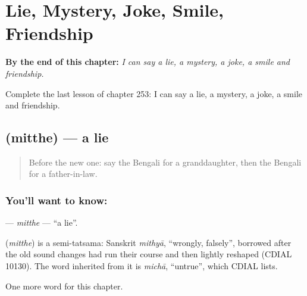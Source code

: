 
\chapter{Lie, Mystery, Joke, Smile, Friendship}
\label{ch:bn-lie-mystery-joke-smile-friendship}

\begin{chapteropening}
\textbf{By the end of this chapter:} \emph{I can say a lie, a mystery, a joke, a smile and friendship.}

Complete the last lesson of chapter 253: I can say a lie, a mystery, a joke, a smile and friendship.
\end{chapteropening}

\section[\texorpdfstring{\bn{মিথ্যে} (mitthe)}{মিথ্যে (mitthe)}]{ (mitthe) — a lie}

\label{lesson:BN-C253-mitthe}



\begin{quote}
Before the new one: say the Bengali for a granddaughter, then the Bengali for a father-in-law.
\end{quote}

\subsection*{You'll want to know: }
\textbf{} — \emph{mitthe} — \textquotedblleft{}a lie\textquotedblright{}.

\begin{cousinweb}
\textbf{} (\emph{mitthe}) is a semi-tatsama: Sanskrit \emph{mithyā}, \textquotedblleft{}wrongly, falsely\textquotedblright{}, borrowed after the old sound changes had run their course and then lightly reshaped (CDIAL 10130). The word inherited from it is \emph{michā}, \textquotedblleft{}untrue\textquotedblright{}, which CDIAL lists.
\end{cousinweb}

\begin{grammarlens}[title={What you've built}]
One more word for this chapter.
\end{grammarlens}

